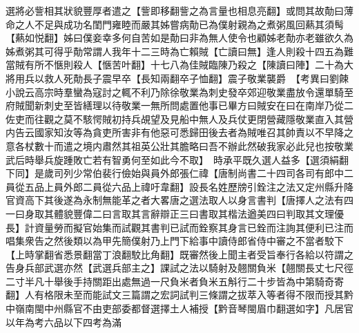 選將必訾相其狀貌豐厚者遣之【訾即移翻訾之為言量也相息亮翻】或問其故勣曰薄命之人不足與成功名閨門雍睦而嚴其姊嘗病勣已為僕射親為之煮粥風回爇其須髩【爇如悦翻】姊曰僕妾幸多何自苦如是勣曰非為無人使令也顧姊老勣亦老雖欲久為姊煮粥其可得乎勣常謂人我年十二三時為亡賴賊【亡讀曰無】逢人則殺十四五為難當賊有所不愜則殺人【愜苦叶翻】十七八為佳賊臨陳乃殺之【陳讀曰陣】二十為大將用兵以救人死勣長子震早卒【長知兩翻卒子恤翻】震子敬業襲爵　【考異曰劉餗小說云高宗時羣蠻為寇討之輒不利乃除徐敬業為刺史發卒郊迎敬業盡放令還單騎至府賊聞新刺史至皆繕理以待敬業一無所問處置他事已畢方曰賊安在曰在南岸乃從二佐吏而往觀之莫不駭愕賊初持兵覘望及見船中無人及兵仗更閉營藏隱敬業直入其營内告云國家知汝等為貪吏所害非有他惡可悉歸田後去者為賊唯召其帥責以不早降之意各杖數十而遣之境内肅然其祖英公壯其膽略曰吾不辦此然破我家必此兒也按敬業武后時舉兵旋踵敗亡若有智勇何至如此今不取】　時承平既久選人益多【選須絹翻下同】是歲司列少常伯裴行儉始與員外郎張仁禕【唐制尚書二十四司各司有郎中二員從五品上員外郎二員從六品上禕吁韋翻】設長名姓歷牓引銓注之法又定州縣升降官資高下其後遂為永制無能革之者大畧唐之選法取人以身言書判【唐擇人之法有四一曰身取其體貌豐偉二曰言取其言辭辯正三曰書取其楷法遒美四曰判取其文理優長】計資量勞而擬官始集而試觀其書判已試而銓察其身言已銓而注詢其便利已注而唱集衆告之然後類以為甲先簡僕射乃上門下給事中讀侍郎省侍中審之不當者駮下【上時掌翻省悉景翻當丁浪翻駮比角翻】既審然後上聞主者受旨奉行各給以符謂之告身兵部武選亦然【武選兵部主之】課試之法以騎射及翹關負米【翹關長丈七尺徑二寸半凡十舉後手持關距出處無過一尺負米者負米五斛行二十步皆為中第騎奇寄翻】人有格限未至而能試文三篇謂之宏詞試判三條謂之拔萃入等者得不限而授其黔中嶺南閩中州縣官不由吏部委都督選擇土人補授【黔音琴閩眉巾翻選如字】凡居官以年為考六品以下四考為滿

